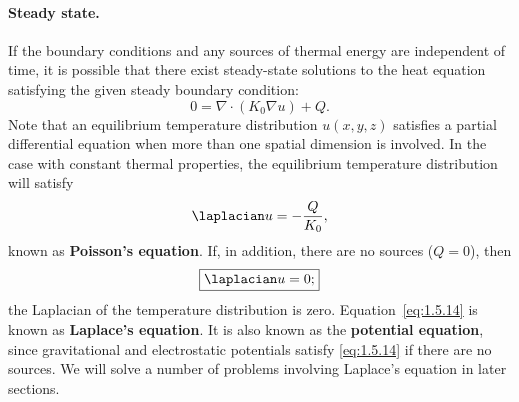 \paragraph{Steady state.}
If the boundary conditions and any sources of thermal energy are independent of time, it is possible that there exist steady-state solutions to the heat equation satisfying the given steady boundary condition:
\[
0 = \nabla\cdot(K_0 \nabla u) + Q.
\]
Note that an equilibrium temperature distribution $u(x,y,z)$ satisfies a partial differential equation when more than one spatial dimension is involved. In the case with constant thermal properties, the equilibrium temperature distribution will satisfy
\begin{equation}
\laplacian u = -\frac{Q}{K_0},
\label{eq:1.5.13}
\end{equation}
known as \textbf{Poisson's equation}. If, in addition, there are no sources ($Q = 0$), then
\begin{equation}
\boxed{\laplacian u = 0;}
\label{eq:1.5.14}
\end{equation}
the Laplacian of the temperature distribution is zero. Equation~\eqref{eq:1.5.14} is known as \textbf{Laplace's equation}. It is also known as the \textbf{potential equation}, since gravitational and electrostatic potentials satisfy \eqref{eq:1.5.14} if there are no sources. We will solve a number of problems involving Laplace's equation in later sections.

